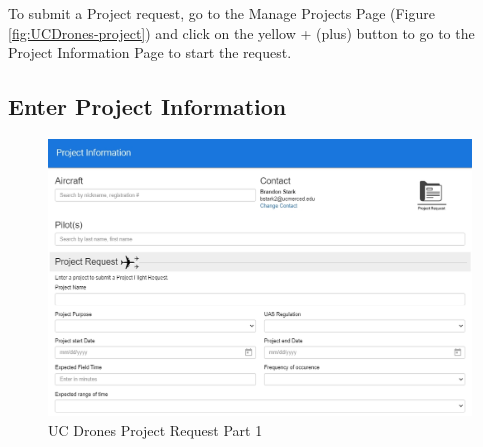 \documentclass[
]{book}
\begin{document}
To submit a Project request, go to the Manage Projects Page (Figure \ref{fig:UCDrones-project}) and click on the yellow + (plus) button to go to the Project Information Page to start the request.

\hypertarget{enter-project-information}{%
\subsection{Enter Project Information}\label{enter-project-information}}

\begin{figure}

{\centering \includegraphics[width=0.95\linewidth]{images/UCDrones_project_1} 

}

\caption{UC Drones Project Request Part 1}\label{fig:UCDrones-project-p1}
\end{figure}
\end{document}
